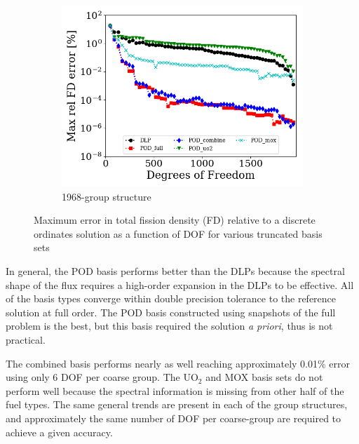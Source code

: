 \documentclass[5p,times,twocolumn,10pt]{elsarticle}
\begin{document}
\begin{figure}[!htbp]
        \begin{subfigure}[b]{\columnwidth}
            \centering
            \includegraphics[scale=0.55]{figures/max_fission_error_1968}
            \caption{1968-group structure}
            \label{fig:maxFD1968}
        \end{subfigure}
        \caption{Maximum error in total fission density (FD) relative to a discrete ordinates solution as a function of DOF for various truncated basis sets}
        \label{fig:maxFD}
    \end{figure}

    In general, the POD basis performs better than the DLPs because the spectral shape of the flux requires a high-order expansion in the DLPs to be effective.
    All of the basis types converge within double precision tolerance to the reference solution at full order.
    The POD basis constructed using snapshots of the full problem is the best, but this basis required the solution {\it a priori}, thus is not practical.

    The combined basis performs nearly as well reaching approximately 0.01\% error using only 6 DOF per coarse group.
    The UO$_2$ and MOX basis sets do not perform well because the spectral information is missing from other half of the fuel types.
    The same general trends are present in each of the group structures, and approximately the same number of DOF per coarse-group are required to achieve a given accuracy.
\end{document}
